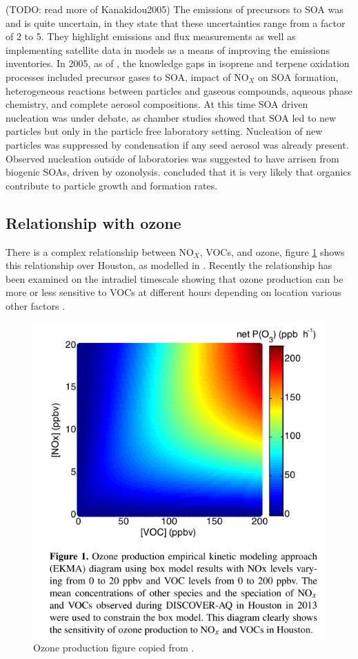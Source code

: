     (TODO: read more of Kanakidou2005)
    The emissions of precursors to SOA was and is quite uncertain, in \cite{Kanakidou2005} they state that these uncertainties range from a factor of 2 to 5.
    They highlight emissions and flux measurements as well as implementing satellite data in models as a means of improving the emissions inventories.
    In 2005, as of \cite{Kanakidou2005}, the knowledge gaps in isoprene and terpene oxidation processes included precursor gases to SOA, impact of NO$_X$ on SOA formation, heterogeneous reactions between particles and gaseous compounds, aqueous phase chemistry, and complete aerosol compositions.
    At this time SOA driven nucleation was under debate, as chamber studies showed that SOA led to new particles but only in the particle free laboratory setting. 
    Nucleation of new particles was suppressed by condensation if any seed aerosol was already present.
    Observed nucleation outside of laboratories was suggested to have arrisen from biogenic SOAs, driven by ozonolysis.
    \cite{Kanakidou2005} concluded that it is very likely that organics contribute to particle growth and formation rates.
    
  \subsection{Relationship with ozone}
    There is a complex relationship between NO$_X$, VOCs, and ozone, figure \ref{ch_LitRev:fig:NOXVOCOzone} shows this relationship over Houston, as modelled in \cite{Mazzuca2016}.
    Recently the relationship has been examined on the intradiel timescale showing that ozone production can be more or less sensitive to VOCs at different hours depending on location various other factors \citep{Mazzuca2016}.
    
    \begin{figure}
      \includegraphics[width=.75\textwidth]{Figures/Mazzuca2016_NOxVOCOzone.png}
      \caption{Ozone production figure copied from \citet{Mazzuca2016}.}
      \label{ch_LitRev:fig:NOXVOCOzone}
    \end{figure}
    
